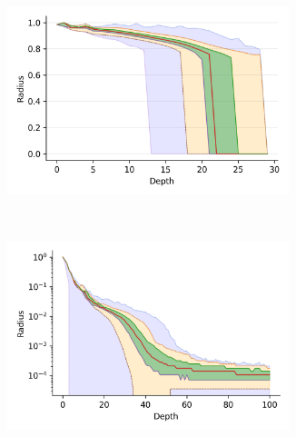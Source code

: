 \documentclass{article}
\begin{document}
\begin{figure}
\begin{subfigure}[b]{0.47\textwidth}
        \label{fig:supplement:sift-radius}
    \end{subfigure}%
    \begin{subfigure}[b]{0.47\textwidth}
        \includegraphics[width=0.9\textwidth]{images/radius/random.png}\\
        \label{fig:supplement:random-radius}
    \end{subfigure}
    \\
    \begin{subfigure}[b]{0.47\textwidth}
        \includegraphics[width=0.9\textwidth]{images/radius/silva-SSU-Ref.png}\\
        \label{fig:supplement:silva-radius}
    \end{subfigure}%
    \begin{subfigure}[b]{0.47\textwidth}

\end{subfigure}
\end{figure}
\end{document}
